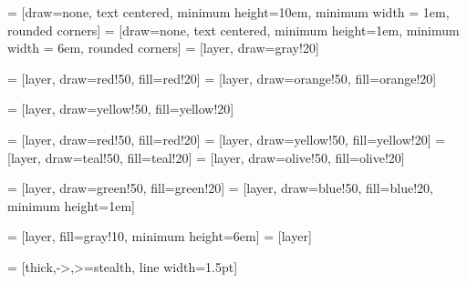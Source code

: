 \usetikzlibrary{automata, calc,trees, positioning, arrows, chains, shapes.geometric,%
	decorations.pathreplacing, decorations.pathmorphing, shapes,%
	matrix,shapes.symbols, positioning, fit, calc, angles, quotes, patterns,%
	decorations.text, backgrounds, petri, intersections, decorations.shape}

\def\blocksx{2.5em}
\def\blocksy{0em}

\def\dimsx{0em}
\def\dimsy{-9em}

\def\layerheight{10em}
\def\layerwidth{1em}  

 = [draw=none, text centered, minimum height=\layerheight,  minimum width = \layerwidth, rounded corners]
 = [draw=none, text centered, minimum height=\layerwidth,  minimum width = 6em, rounded corners]
 = [layer, draw=gray!20]		%

 = [layer, draw=red!50, fill=red!20]		%
 = [layer, draw=orange!50, fill=orange!20]		%

 = [layer, draw=yellow!50, fill=yellow!20]		%

 = [layer, draw=red!50, fill=red!20]
 = [layer, draw=yellow!50, fill=yellow!20]
 = [layer, draw=teal!50, fill=teal!20]
 = [layer, draw=olive!50, fill=olive!20]

 = [layer, draw=green!50, fill=green!20] 		%
 = [layer, draw=blue!50, fill=blue!20, minimum height=1em]

 = [layer, fill=gray!10,  minimum height=6em]
 = [layer]

\newcommand{\rot}[1]{\rotatebox{90}{#1}}

 = [thick,->,>=stealth, line width=1.5pt]
